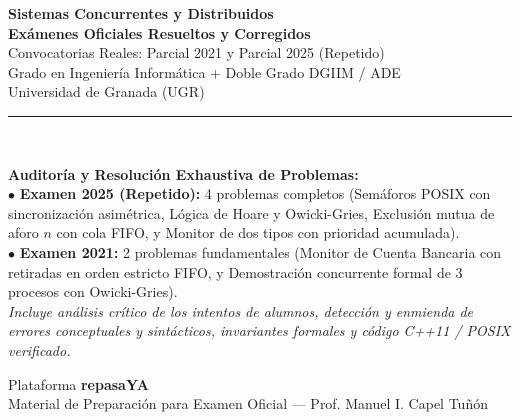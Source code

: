 \documentclass[11pt,a4paper,twoside,openright]{report}
\begin{document}
\begin{titlepage}
    \centering
    \vspace*{1.2cm}
    
    {\Huge\bfseries\color{scdDarkBlue}\textsf{Sistemas Concurrentes y Distribuidos}}\\[0.6cm]
    {\LARGE\bfseries\color{scdPrimary}\textsf{Exámenes Oficiales Resueltos y Corregidos}}\\[0.4cm]
    {\large\textsf{Convocatorias Reales: Parcial 2021 y Parcial 2025 (Repetido)}}\\[0.3cm]
    {\normalsize\textsf{Grado en Ingeniería Informática + Doble Grado DGIIM / ADE}}\\[0.2cm]
    {\normalsize\textsf{Universidad de Granada (UGR)}}\\[1.2cm]
    
    \rule{0.85\textwidth}{1.5pt}\\[1.4cm]
    
    \begin{tcolorbox}[
        colback=scdLightAccent,
        colframe=scdAccent,
        width=0.88\textwidth,
        arc=4pt,
        halign=center
    ]
        \large\textbf{\color{scdDarkBlue}Auditoría y Resolución Exhaustiva de Problemas:}\\[6pt]
        \normalsize
        $\bullet$ \textbf{Examen 2025 (Repetido):} 4 problemas completos (Semáforos POSIX con sincronización asimétrica, Lógica de Hoare y Owicki-Gries, Exclusión mutua de aforo $n$ con cola FIFO, y Monitor de dos tipos con prioridad acumulada).\\[4pt]
        $\bullet$ \textbf{Examen 2021:} 2 problemas fundamentales (Monitor de Cuenta Bancaria con retiradas en orden estricto FIFO, y Demostración concurrente formal de 3 procesos con Owicki-Gries).\\[6pt]
        \small\textit{Incluye análisis crítico de los intentos de alumnos, detección y enmienda de errores conceptuales y sintácticos, invariantes formales y código C++11 / POSIX verificado.}
    \end{tcolorbox}
    
    \vfill
    
    {\large\textsf{Plataforma \textbf{repasaYA}}}\\[0.2cm]
    {\small\textsf{Material de Preparación para Examen Oficial — Prof. Manuel I. Capel Tuñón}}\\[0.6cm]
\end{titlepage}
\end{document}
